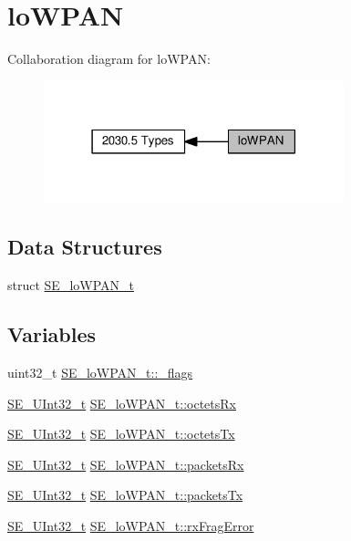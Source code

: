 \hypertarget{group__loWPAN}{}\section{lo\+W\+P\+AN}
\label{group__loWPAN}
Collaboration diagram for lo\+W\+P\+AN\+:\nopagebreak
\begin{figure}[H]
\begin{center}
\leavevmode
\includegraphics[width=247pt]{group__loWPAN}
\end{center}
\end{figure}
\subsection*{Data Structures}
\begin{DoxyCompactItemize}
\item 
struct \hyperlink{structSE__loWPAN__t}{S\+E\+\_\+lo\+W\+P\+A\+N\+\_\+t}
\end{DoxyCompactItemize}
\subsection*{Variables}
\begin{DoxyCompactItemize}
\item 
uint32\+\_\+t \hyperlink{group__loWPAN_gab083d76b8f124eb2b3cb3a4cd7094116}{S\+E\+\_\+lo\+W\+P\+A\+N\+\_\+t\+::\+\_\+flags}
\item 
\hyperlink{group__UInt32_ga70bd4ecda3c0c85d20779d685a270cdb}{S\+E\+\_\+\+U\+Int32\+\_\+t} \hyperlink{group__loWPAN_ga180bdc9789d931b6914aa16241bbbf8d}{S\+E\+\_\+lo\+W\+P\+A\+N\+\_\+t\+::octets\+Rx}
\item 
\hyperlink{group__UInt32_ga70bd4ecda3c0c85d20779d685a270cdb}{S\+E\+\_\+\+U\+Int32\+\_\+t} \hyperlink{group__loWPAN_gabf0fae7d35cec99a725c1f893d048896}{S\+E\+\_\+lo\+W\+P\+A\+N\+\_\+t\+::octets\+Tx}
\item 
\hyperlink{group__UInt32_ga70bd4ecda3c0c85d20779d685a270cdb}{S\+E\+\_\+\+U\+Int32\+\_\+t} \hyperlink{group__loWPAN_gaa3c772f3cc59ca141b1b8d8f405baf09}{S\+E\+\_\+lo\+W\+P\+A\+N\+\_\+t\+::packets\+Rx}
\item 
\hyperlink{group__UInt32_ga70bd4ecda3c0c85d20779d685a270cdb}{S\+E\+\_\+\+U\+Int32\+\_\+t} \hyperlink{group__loWPAN_ga4052b1da9bfea628b6d61abc0d4c1edd}{S\+E\+\_\+lo\+W\+P\+A\+N\+\_\+t\+::packets\+Tx}
\item 
\hyperlink{group__UInt32_ga70bd4ecda3c0c85d20779d685a270cdb}{S\+E\+\_\+\+U\+Int32\+\_\+t} \hyperlink{group__loWPAN_gac2ecf874c1830af68defca2dce2d3af4}{S\+E\+\_\+lo\+W\+P\+A\+N\+\_\+t\+::rx\+Frag\+Error}
\end{DoxyCompactItemize}


